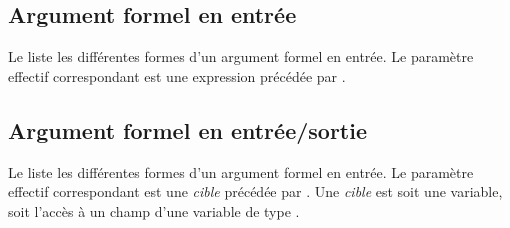 
\subsection{Argument formel en entrée}

Le  liste les différentes formes d'un argument formel en entrée. Le paramètre effectif correspondant est une expression précédée par \galgas{\!}.

\begin{table}[!ht]
  \centering
  \caption{Argument formel en entrée, paramètre effectif en sortie}
\end{table}

\subsection{Argument formel en entrée/sortie}

Le  liste les différentes formes d'un argument formel en entrée. Le paramètre effectif correspondant est une \emph{cible} précédée par \galgas{\!\?}. Une \emph{cible} est soit une variable, soit l'accès à un champ d'une variable de type .

